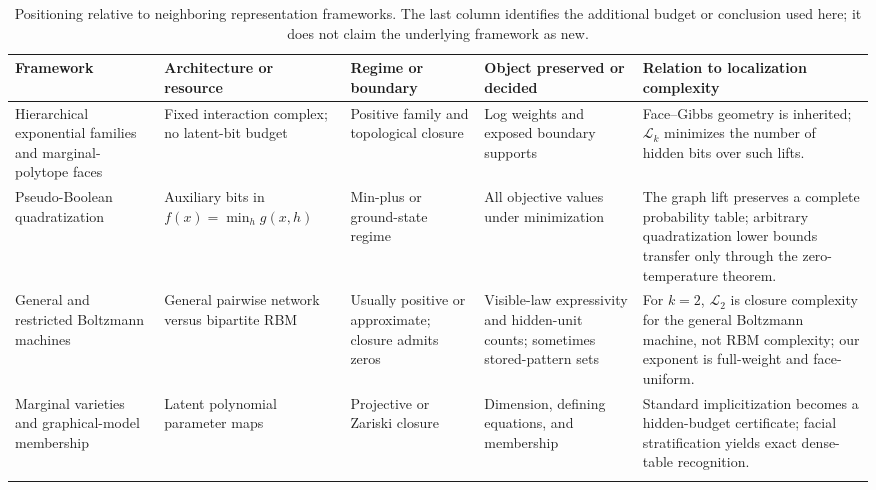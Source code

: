 \documentclass{article}
\newcommand{\LC}{\mathcal{L}}
\begin{document}
\begin{table}[!ht]
\centering
\caption{Positioning relative to neighboring representation frameworks.  The
last column identifies the additional budget or conclusion used here; it does
not claim the underlying framework as new.}
\label{tab:framework-comparison}
\footnotesize
\setlength{\tabcolsep}{2.5pt}
\renewcommand{\arraystretch}{1.06}
\begin{tabularx}{\textwidth}{
  @{}
  P{0.178\textwidth}
  P{0.137\textwidth}
  P{0.115\textwidth}
  P{0.180\textwidth}
  Y
  @{}
}
\toprule
Framework
& Architecture or resource
& Regime or boundary
& Object preserved or decided
& Relation to localization complexity
\\
\midrule

Hierarchical exponential families and marginal-polytope faces
\cite{rauh11,malago11,kahle10}
&
Fixed interaction complex; no latent-bit budget
&
Positive family and topological closure
&
Log weights and exposed boundary supports
&
Face--Gibbs geometry is inherited; $\LC_k$ minimizes the number of hidden
bits over such lifts.
\\\addlinespace[2pt]

Pseudo-Boolean quadratization
\cite{anthony17,anthony16,bcrh20}
&
Auxiliary bits in $f(x)=\min_h g(x,h)$
&
Min-plus or ground-state regime
&
All objective values under minimization
&
The graph lift preserves a complete probability table; arbitrary
quadratization lower bounds transfer only through the zero-temperature
theorem.
\\\addlinespace[2pt]

General and restricted Boltzmann machines
\cite{moserkameda92,montufaray11,montufarrauh17}
&
General pairwise network versus bipartite RBM
&
Usually positive or approximate; closure admits zeros
&
Visible-law expressivity and hidden-unit counts; sometimes stored-pattern sets
&
For $k=2$, $\LC_2$ is closure complexity for the general Boltzmann machine,
not RBM complexity; our exponent is full-weight and face-uniform.
\\\addlinespace[2pt]

Marginal varieties and graphical-model membership
\cite{geiger06,cuetomortonsturmfels10,critch13,seigalmontufar18}
&
Latent polynomial parameter maps
&
Projective or Zariski closure
&
Dimension, defining equations, and membership
&
Standard implicitization becomes a hidden-budget certificate; facial
stratification yields exact dense-table recognition.
\\\addlinespace[2pt]


\end{tabularx}
\end{table}
\end{document}
